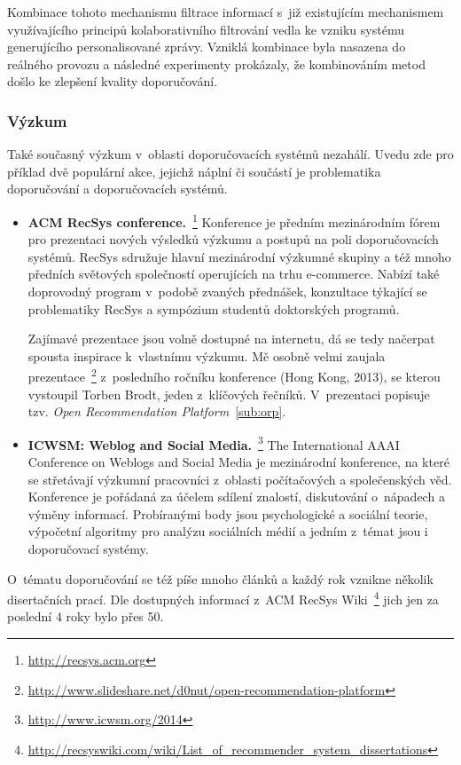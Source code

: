 \documentclass[thesis=M,czech]{FITthesis}[2014/05/07]
\begin{document}
Kombinace tohoto mechanismu filtrace informací s~již existujícím mechanismem využívajícího principů kolaborativního filtrování vedla ke vzniku systému generujícího personalisované zprávy. Vzniklá kombinace byla nasazena do reálného provozu a následné experimenty prokázaly, že kombinováním metod došlo ke zlepšení kvality doporučování.

\subsubsection{Výzkum}

Také současný výzkum v~oblasti doporučovacích systémů nezahálí. Uvedu zde pro příklad dvě populární akce, jejichž náplní či součástí je problematika doporučování a doporučovacích systémů.

\begin{itemize}
  \item \textbf{ACM RecSys conference.}~\footnote{\url{http://recsys.acm.org}} Konference je předním mezinárodním fórem pro prezentaci nových výsledků výzkumu a postupů na poli doporučovacích systémů. RecSys sdružuje hlavní mezinárodní výzkumné skupiny a též mnoho předních světových společností operujících na trhu e-commerce. Nabízí také doprovodný program v~podobě zvaných přednášek, konzultace týkající se problematiky RecSys a sympózium studentů doktorských programů. 
  
  Zajímavé prezentace jsou volně dostupné na internetu, dá se tedy načerpat spousta inspirace k~vlastnímu výzkumu. Mě osobně velmi zaujala prezentace~\footnote{\url{http://www.slideshare.net/d0nut/open-recommendation-platform}} z~posledního ročníku konference (Hong Kong, 2013), se kterou vystoupil Torben Brodt, jeden z~klíčových řečníků. V~prezentaci popisuje tzv. \emph{Open Recommendation Platform}~\ref{sub:orp}. 
  
  \item \textbf{ICWSM: Weblog and Social Media.}~\footnote{\url{http://www.icwsm.org/2014}} The International AAAI Conference on Weblogs and Social Media je mezinárodní konference, na které se střetávají výzkumní pracovníci z~oblasti počítačových a společenských věd. Konference je pořádaná za účelem sdílení znalostí, diskutování o~nápadech a výměny informací. Probíranými body jsou psychologické a sociální teorie, výpočetní algoritmy pro analýzu sociálních médií a jedním z~témat jsou i doporučovací systémy.
\end{itemize}

O~tématu doporučování se též píše mnoho článků a každý rok vznikne několik disertačních prací. Dle dostupných informací z~ACM RecSys Wiki~\footnote{\url{http://recsyswiki.com/wiki/List_of_recommender_system_dissertations}} jich jen za poslední 4 roky bylo přes 50.
\end{document}
